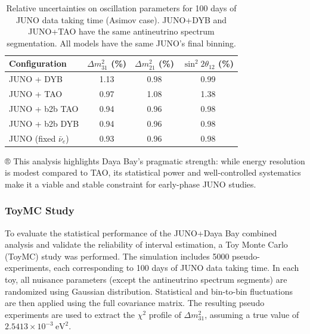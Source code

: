 \begin{table}[H]
  \centering
  \caption{Relative uncertainties on oscillation parameters for 100 days of JUNO data taking time
  (Asimov case). JUNO+DYB and JUNO+TAO have the same antineutrino spectrum segmentation. All models
  have the same JUNO's final binning.}
  \label{tab:junodyb_asimov}
  \begin{tabular}{lccc} \toprule
    Configuration & $\Delta m^2_{31}$ (\%) & $\Delta m^2_{21}$ (\%) & $\sin^2 2\theta_{12}$ (\%) \\
    \midrule
    JUNO + DYB                 & 1.13 & 0.98 & 0.99 \\
    JUNO + TAO                 & 0.97 & 1.08 & 1.38 \\
    JUNO + b2b TAO             & 0.94 & 0.96 & 0.98 \\
    JUNO + b2b DYB             & 0.94 & 0.96 & 0.98 \\
    JUNO (fixed $\bar{\nu}_e$) & 0.93 & 0.96 & 0.98 \\
    \bottomrule
  \end{tabular}
\end{table}
®
This analysis highlights Daya Bay’s pragmatic strength: while energy resolution is modest compared
to TAO, its statistical power and well-controlled systematics make it a viable and stable constraint
for early-phase JUNO studies.

\subsubsection{ToyMC Study}
To evaluate the statistical performance of the JUNO+Daya Bay combined analysis and validate the
reliability of interval estimation, a Toy Monte Carlo (ToyMC) study was performed. The simulation
includes 5000 pseudo-experiments, each corresponding to 100 days of JUNO data taking time. In each
toy, all nuisance parameters (except the antineutrino spectrum segments) are randomized using
Gaussian distribution. Statistical and bin-to-bin fluctuations are then applied using the full
covariance matrix. The resulting pseudo experiments are used to extract the $\chi^2$ profile of
$\Delta m^2_{31}$, assuming a true value of $2.5413 \times 10^{-3}~\text{eV}^2$.

